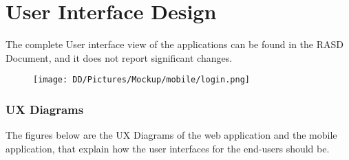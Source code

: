 \chapter{User Interface Design}
The complete User interface view of the applications can be found in the RASD Document, and it does not report significant changes.
\begin{figure}[H]
    \centering
   
\end{figure}
\begin{figure}[H]
    \centering
    \texttt{[image: DD/Pictures/Mockup/mobile/login.png]}
    
\end{figure}


\subsection{UX Diagrams}
The figures below are the UX Diagrams of the web application and the mobile application, that explain how the user interfaces for the end-users should be.
